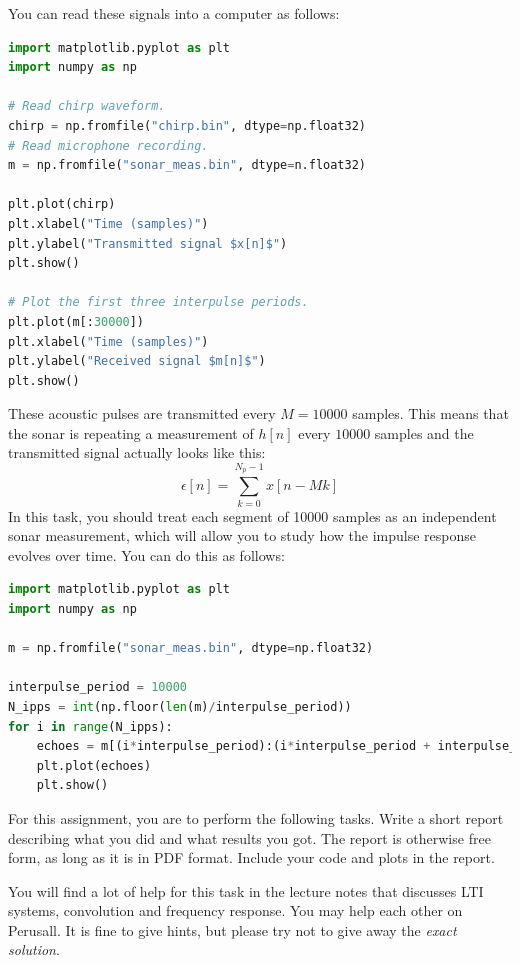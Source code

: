 You can read these signals into a
computer as follows:
\begin{lstlisting}[language=Python, numbers=none]
import matplotlib.pyplot as plt
import numpy as np

# Read chirp waveform.
chirp = np.fromfile("chirp.bin", dtype=np.float32)
# Read microphone recording.
m = np.fromfile("sonar_meas.bin", dtype=n.float32)

plt.plot(chirp)
plt.xlabel("Time (samples)")
plt.ylabel("Transmitted signal $x[n]$")
plt.show()

# Plot the first three interpulse periods.
plt.plot(m[:30000])
plt.xlabel("Time (samples)")
plt.ylabel("Received signal $m[n]$")
plt.show()
\end{lstlisting}
These acoustic pulses are transmitted every $M=10000$ samples. This
means that the sonar is repeating a measurement of $h[n]$ every
$10000$ samples and the transmitted signal actually looks like this:
\begin{equation}
  \epsilon[n] = \sum_{k=0}^{N_p-1} x[n - Mk]
\end{equation}
In this task, you should treat each segment of 10000 samples as an
independent sonar measurement, which will allow you to study how the
impulse response evolves over time. You can do this as follows:
\begin{lstlisting}[language=Python, numbers=none]
import matplotlib.pyplot as plt
import numpy as np

m = np.fromfile("sonar_meas.bin", dtype=np.float32)

interpulse_period = 10000
N_ipps = int(np.floor(len(m)/interpulse_period))
for i in range(N_ipps):
    echoes = m[(i*interpulse_period):(i*interpulse_period + interpulse_period)]
    plt.plot(echoes)
    plt.show()
\end{lstlisting}

For this assignment, you are to perform the following tasks. Write a
short report describing what you did and what results you got. The
report is otherwise free form, as long as it is in PDF format. Include
your code and plots in the report. 

You will find a lot of help for this task in the lecture notes that
discusses LTI systems, convolution and frequency response. You may
help each other on Perusall. It is fine to give hints, but please try
not to give away the \emph{exact solution}.

